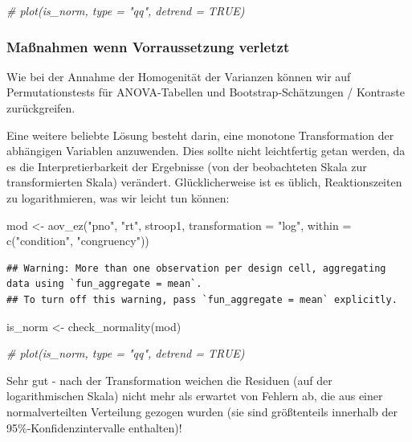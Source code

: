 \documentclass[
]{book}
\newenvironment{Shaded}{\begin{snugshade}}{\end{snugshade}}
\newcommand{\AttributeTok}[1]{\textcolor[rgb]{0.77,0.63,0.00}{#1}}
\newcommand{\CommentTok}[1]{\textcolor[rgb]{0.56,0.35,0.01}{\textit{#1}}}
\newcommand{\FunctionTok}[1]{\textcolor[rgb]{0.00,0.00,0.00}{#1}}
\newcommand{\NormalTok}[1]{#1}
\newcommand{\OtherTok}[1]{\textcolor[rgb]{0.56,0.35,0.01}{#1}}
\newcommand{\StringTok}[1]{\textcolor[rgb]{0.31,0.60,0.02}{#1}}
\begin{document}
\begin{Shaded}
\begin{Highlighting}[]
\CommentTok{\# plot(is\_norm, type = "qq", detrend = TRUE)}
\end{Highlighting}
\end{Shaded}

\hypertarget{mauxdfnahmen-wenn-vorraussetzung-verletzt-2}{%
\subsubsection{Maßnahmen wenn Vorraussetzung verletzt}\label{mauxdfnahmen-wenn-vorraussetzung-verletzt-2}}

Wie bei der Annahme der Homogenität der Varianzen können wir auf Permutationstests für ANOVA-Tabellen und Bootstrap-Schätzungen / Kontraste zurückgreifen.

Eine weitere beliebte Lösung besteht darin, eine monotone Transformation der abhängigen Variablen anzuwenden. Dies sollte nicht leichtfertig getan werden, da es die Interpretierbarkeit der Ergebnisse (von der beobachteten Skala zur transformierten Skala) verändert. Glücklicherweise ist es üblich, Reaktionszeiten zu logarithmieren, was wir leicht tun können:

\begin{Shaded}
\begin{Highlighting}[]
\NormalTok{mod }\OtherTok{\textless{}{-}} \FunctionTok{aov\_ez}\NormalTok{(}\StringTok{"pno"}\NormalTok{, }\StringTok{"rt"}\NormalTok{, stroop1,}
             \AttributeTok{transformation =} \StringTok{"log"}\NormalTok{,}
             \AttributeTok{within =} \FunctionTok{c}\NormalTok{(}\StringTok{"condition"}\NormalTok{, }\StringTok{"congruency"}\NormalTok{))}
\end{Highlighting}
\end{Shaded}

\begin{verbatim}
## Warning: More than one observation per design cell, aggregating data using `fun_aggregate = mean`.
## To turn off this warning, pass `fun_aggregate = mean` explicitly.
\end{verbatim}

\begin{Shaded}
\begin{Highlighting}[]
\NormalTok{is\_norm }\OtherTok{\textless{}{-}} \FunctionTok{check\_normality}\NormalTok{(mod)}

\CommentTok{\# plot(is\_norm, type = "qq", detrend = TRUE)}
\end{Highlighting}
\end{Shaded}

Sehr gut - nach der Transformation weichen die Residuen (auf der logarithmischen Skala) nicht mehr als erwartet von Fehlern ab, die aus einer normalverteilten Verteilung gezogen wurden (sie sind größtenteils innerhalb der 95\%-Konfidenzintervalle enthalten)!

  
\end{document}
